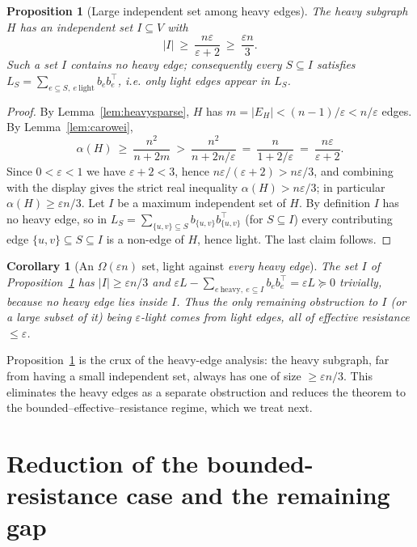 \documentclass[12pt]{article}
\newtheorem{proposition}{Proposition}
\newtheorem{corollary}{Corollary}
\theoremstyle{definition}
\newcommand{\eps}{\varepsilon}
\newcommand{\psd}{\succeq 0}
\begin{document}
\begin{proposition}[Large independent set among heavy edges]\label{prop:heavy}
The heavy subgraph $H$ has an independent set $I\subseteq V$ with
\[
|I|\ \ge\ \frac{n\eps}{\eps+2}\ \ge\ \frac{\eps n}{3}.
\]
Such a set $I$ contains no heavy edge; consequently every $S\subseteq I$ satisfies
$L_S=\sum_{e\subseteq S,\ e\ \mathrm{light}}b_eb_e^\top$, i.e. only light edges appear in $L_S$.
\end{proposition}
\begin{proof}
By Lemma~\ref{lem:heavysparse}, $H$ has $m=|E_H|<(n-1)/\eps<n/\eps$ edges. By
Lemma~\ref{lem:carowei},
\[
\alpha(H)\ \ge\ \frac{n^2}{n+2m}\ >\ \frac{n^2}{n+2n/\eps}\ =\ \frac{n}{1+2/\eps}\ =\
\frac{n\eps}{\eps+2}.
\]
Since $0<\eps<1$ we have $\eps+2<3$, hence $n\eps/(\eps+2)>n\eps/3$, and combining with the
display gives the strict real inequality $\alpha(H)>n\eps/3$; in particular $\alpha(H)\ge\eps n/3$.
Let $I$ be a maximum independent set of $H$. By definition
$I$ has no heavy edge, so in $L_S=\sum_{\{u,v\}\subseteq S}b_{\{u,v\}}b_{\{u,v\}}^\top$ (for
$S\subseteq I$) every contributing edge $\{u,v\}\subseteq S\subseteq I$ is a non-edge of $H$, hence
light. The last claim follows.
\end{proof}

\begin{corollary}[An $\Omega(\eps n)$ set, light against \emph{every heavy edge}]\label{cor:heavylight}
The set $I$ of Proposition~\ref{prop:heavy} has $|I|\ge\eps n/3$ and $\eps L-\sum_{e\ \mathrm{heavy},
\ e\subseteq I}b_eb_e^\top=\eps L\psd$ trivially, because no heavy edge lies inside $I$. Thus the
only remaining obstruction to $I$ (or a large subset of it) being $\eps$-light comes from
\emph{light} edges, all of effective resistance $\le\eps$.
\end{corollary}

Proposition~\ref{prop:heavy} is the crux of the heavy-edge analysis: the heavy subgraph, far from
having a small independent set, always has one of size $\ge\eps n/3$. This eliminates the heavy edges
as a separate obstruction and reduces the theorem to the bounded--effective--resistance regime, which
we treat next.

\section{Reduction of the bounded-resistance case and the remaining gap}\label{sec:reduce}
\end{document}
